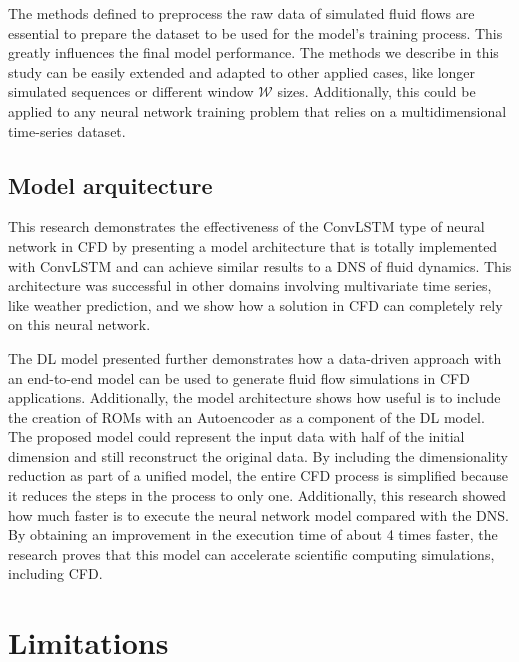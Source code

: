 The methods defined to preprocess the raw data of simulated fluid flows are essential to prepare the dataset to be used for the model's training process. This greatly influences the final model performance. The methods we describe in this study can be easily extended and adapted to other applied cases, like longer simulated sequences or different window $\mathcal{W}$ sizes. Additionally, this could be applied to any neural network training problem that relies on a multidimensional time-series dataset.

\subsection{Model arquitecture}

This research demonstrates the effectiveness of the ConvLSTM type of neural network in CFD by presenting a model architecture that is totally implemented with ConvLSTM and can achieve similar results to a DNS of fluid dynamics. This architecture was successful in other domains involving multivariate time series, like weather prediction, and we show how a solution in CFD can completely rely on this neural network.

The DL model presented further demonstrates how a data-driven approach with an end-to-end model can be used to generate fluid flow simulations in CFD applications. Additionally, the model architecture shows how useful is to include the creation of ROMs with an Autoencoder as a component of the DL model. The proposed model could represent the input data with half of the initial dimension and still reconstruct the original data. By including the dimensionality reduction as part of a unified model, the entire CFD process is simplified because it reduces the steps in the process to only one. Additionally, this research showed how much faster is to execute the neural network model compared with the DNS. By obtaining an improvement in the execution time of about 4 times faster, the research proves that this model can accelerate scientific computing simulations, including CFD. 

\section{Limitations}
\label{sec:Limitations}

